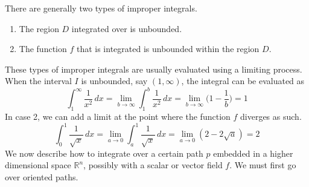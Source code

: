   There are generally two types of improper integrals. 
  \begin{enumerate}
    \item The region $D$ integrated over is unbounded. 
    \item The function $f$ that is integrated is unbounded within the region $D$.
  \end{enumerate}

  These types of improper integrals are usually evaluated using a limiting process. When the interval $I$ is unbounded, say $(1, \infty)$, the integral can be evaluated as 
  \[\int_1^\infty \frac{1}{x^2} \,dx = \lim_{b \rightarrow \infty} \int_1^b \frac{1}{x^2} \, dx = \lim_{b\rightarrow \infty} \bigg( 1 - \frac{1}{b} \bigg) = 1\]
  In case 2, we can add a limit at the point where the function $f$ diverges as such. 
  \[\int_0^1 \frac{1}{\sqrt{x}} \, dx = \lim_{a \rightarrow 0} \int_a^1 \frac{1}{\sqrt{x}} \, dx = \lim_{a \rightarrow 0} (2 - 2\sqrt{a}) = 2\]
  We now describe how to integrate over a certain path $p$ embedded in a higher dimensional space $\mathbb{R}^n$, possibly with a scalar or vector field $f$. We must first go over oriented paths. 

